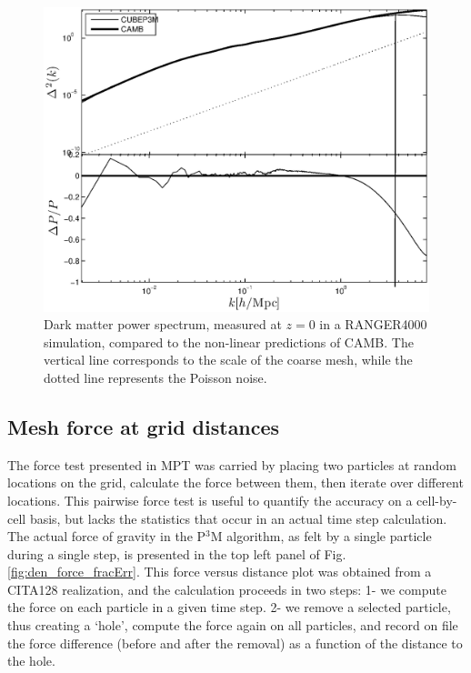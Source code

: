 \documentclass[useAMS,usenatbib]{mn2e}
\begin{document}
\begin{figure}%
  \begin{center}
    \includegraphics[width=5.2in]{graphs/power_highres.eps}
  \caption{Dark matter power spectrum, measured at $z=0$ in a RANGER4000 simulation,
  compared to the non-linear predictions of {\small CAMB}. 
  The vertical line corresponds to the scale of the coarse mesh, while the dotted line represents the Poisson noise.
    \label{fig:power_highres}}
\end{center}
\end{figure}

\subsection{Mesh force at grid distances}
\label{subsec:force}

The force test presented in MPT was carried by placing two particles at random locations on the grid, calculate the force between them, then iterate
over different locations. This pairwise force test is useful to quantify the accuracy on a cell-by-cell basis, but lacks the statistics that occur in an actual time step calculation.  
The actual force of gravity in the P$^3$M algorithm,
as felt by a single particle during a single step, is presented in the top left panel of Fig. \ref{fig:den_force_fracErr}.
This force versus distance plot was obtained from a CITA128 realization, and the calculation proceeds in two steps: 
1- we compute the force on each particle in a given time step.
2- we remove a selected particle, thus creating a `hole', compute the force again on all particles, and record on file the 
force difference (before  and after the removal) as a function of the distance to the hole.
\end{document}
